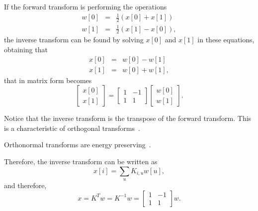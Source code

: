 If the forward transform is performing the operations
\begin{equation*}
  \begin{array}{rcl}
  w[0] & = & \frac{1}{2}(x[0] + x[1])\\
  w[1] & = & \frac{1}{2}(x[1] - x[0]),
  \end{array}
\end{equation*}
the inverse transform can be found by solving $x[0]$ and $x[1]$ in
these equations, obtaining that
\begin{equation*}
  \begin{array}{rcl}
  x[0] & = & w[0] - w[1]\\
  x[1] & = & w[0] + w[1],
  \end{array}
\end{equation*}
that in matrix form becomes
\begin{equation*}
  \begin{bmatrix}
    x[0] \\
    x[1]
  \end{bmatrix}
  = 
  \begin{bmatrix} 1 & -1 \\ 1 & 1 \end{bmatrix}
  \begin{bmatrix}
    w[0] \\
    w[1]
  \end{bmatrix}.
\end{equation*}

Notice that the inverse transform is the transpose of the forward transform. This is a characteristic of orthogonal transforms~\cite{sayood2017introduction}.

Orthonormal transforms are energy preserving~\cite{sayood2017introduction}.

Therefore, the inverse transform can be written as
\begin{equation}
  x[i] = \sum_u K_{i,u}w[u],
  \label{eq:inverse_transform_linear_combination_form}
\end{equation}
and therefore,
\begin{equation}
  x = K^Tw = K^{-1}w = \begin{bmatrix} 1 & -1 \\ 1 & 1 \end{bmatrix}w.
  \label{eq:inverse_transform_matrix_form}
\end{equation}

